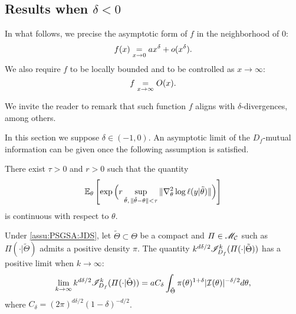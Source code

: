 \subsection{Results when $\delta<0$}

In what follows, we precise the asymptotic form of $f$ in the neighborhood of $0$:
    \begin{equation}
        f(x) \overset{}{\underset{x\rightarrow0}{=}} a x^\delta + o(x^\delta).
    \end{equation}
We also require $f$ to be locally bounded and to be controlled as $x\to\infty$: 
\begin{equation}
    f\overset{}{\underset{x\rightarrow\infty}{=}}O(x).
\end{equation}

We invite the reader to remark that such function $f$ aligns with $\delta$-divergences, among others.

In this section we suppose $\delta\in(-1,0)$. 
An asymptotic limit of the $D_f$-mutual information can be given once the following assumption is satisfied.
\begin{assu}
    \label{assu:PSGSA:JDS}
        There exist $\tau>0$ and $r>0$ such that the quantity 
            \begin{equation}
                \mathbb{E}_\theta\left[\exp\Big(r\sup_{\tilde\theta,\,\|\tilde\theta-\theta\|<\tau}\|\nabla^2_\theta\log\ell(y|\tilde\theta)\|\Big)\right] 
            \end{equation}
        is continuous with respect to  $\theta$. %
    \end{assu}


\begin{thm}
    Under \cref{assu:PSGSA:JDS}, let $\tilde\Theta\subset\Theta$ be a compact and $\varPi\in\mathscr{M}_{\mathcal{C}}$ such as $\varPi(\cdot|\tilde\Theta)$ admits a positive density $\pi$. 
    The quantity $k^{d\delta/2}\mathscr{I}^k_{D_f}(\varPi(\cdot|\tilde\Theta))$ has a positive limit when $k\to\infty$:
    \begin{align}
    \label{eq:limitkbeta}
            \lim_{k\rightarrow\infty} k^{d\delta/2} \mathscr{I}^k_{D_f}(\varPi(\cdot|\tilde\Theta)) = 
    a C_\delta \int_{\tilde\Theta}\pi(\theta)^{1+\delta} |\mathcal{I}(\theta)|^{-\delta/2}  d\theta ,
        \end{align}
    where $ C_\delta = (2\pi)^{d\delta/2} (1-\delta)^{-d/2}$. 
    \end{thm}

